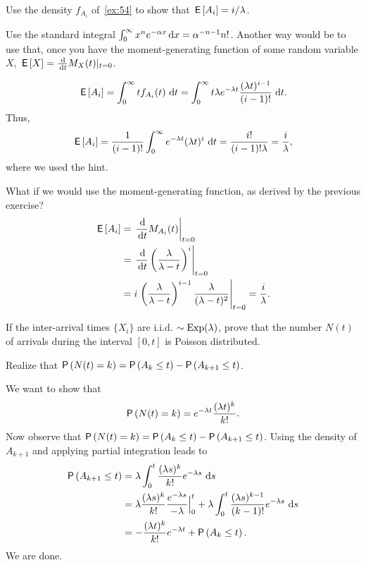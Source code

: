 \begin{extra}
 Use the density $f_{A_i}$ of~\cref{ex:54} to show that $\,\mathsf{E}\left[A_i\right]=i/\lambda$. 
\begin{hint}
Use the standard integral 
 $\int_0^\infty x^n e^{-\alpha x} \,\text{d}x =
 \alpha^{-n-1}n!$. 
 Another way would be to use that, once you have the moment-generating function of some random variable $X$,
 $\E X = \frac{\d}{\d t} M_X(t) |_{t=0}$. 
\end{hint}
\begin{solution}
 \begin{equation*}
\,\mathsf{E}\left[A_i\right] = \int_0^\infty t f_{A_i} (t) \, \,\text{d}t = 
\int_0^\infty t \lambda e^{-\lambda t} \frac{(\lambda t)^{i-1}}{(i-1)!}\, \,\text{d}t.
 \end{equation*}
Thus, 
 \begin{equation*}
\,\mathsf{E}\left[A_i\right] = \frac{1}{(i-1)!} \int_0^\infty e^{-\lambda t} (\lambda t)^i\,\,\text{d}t = \frac{i!}{(i-1)!\lambda}=\frac{i}\lambda,
 \end{equation*}
 where we used the hint.

What if we would use the moment-generating function, as derived by the previous exercise?
\begin{align*}
 \E{A_i} 
&= \left.\frac{\d}{\d t} M_{A_i}(t)\right|_{t=0} \\
&= \left.\frac{\d}{\d t} \left(\frac{\lambda}{\lambda-t}\right)^i\right|_{t=0} \\
&= i \left.\left(\frac{\lambda}{\lambda-t}\right)^{i-1}\frac{\lambda}{(\lambda-t)^2}\right|_{t=0} 
= \frac i\lambda.
\end{align*}


\end{solution}
\end{extra}

\begin{exercise}
 If the inter-arrival times $\{X_i\}$ are i.i.d.
 $\sim \operatorname{Exp}(\lambda)$, prove that the number $N(t)$ of arrivals during the interval $[0,t]$ is Poisson distributed.
\begin{hint}
 Realize that
 $\P{N(t)=k} = \P{A_k \leq t} - \P{A_{k+1} \leq t}$.
\end{hint}
\begin{solution}
 We want to show that
 \begin{equation*}
 \P{N(t)=k} = e^{-\lambda t}\frac{(\lambda t)^k}{k!}.
 \end{equation*}
 Now observe that $\P{N(t)=k} = \P{A_k \leq t} - \P{A_{k+1} \leq t}$.
 Using the density of $A_{k+1}$ and applying partial integration leads to
\begin{align*}
\P{A_{k+1} \leq t} 
&= \lambda \int_0^t \frac{(\lambda s)^{k}}{k!}e^{-\lambda s}\, \d s \\
&= \lambda \frac{(\lambda s)^{k}}{k!}\frac{e^{-\lambda s}}{-\lambda} \Big|_{0}^t + \lambda \int_0^t \frac{(\lambda s)^{k-1}}{(k-1)!}e^{-\lambda s}\, \d s \\
&= - \frac{(\lambda t)^{k}}{k!} e^{-\lambda t} + \P{A_k \leq t}.
\end{align*}
We are done.
\end{solution}
\end{exercise}

